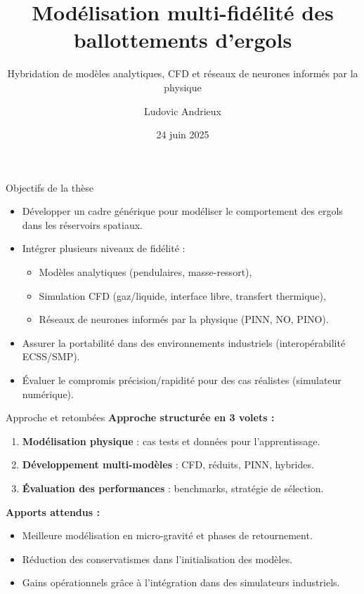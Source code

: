 \documentclass{beamer}
\title[Proposition de thèse]{Modélisation multi-fidélité des ballottements d’ergols}
\subtitle{Hybridation de modèles analytiques, CFD et réseaux de neurones informés par la physique}
\author{Ludovic Andrieux}
\date{24 juin 2025}
\begin{document}
	
	\frame{\titlepage}
	
	\begin{frame}{Objectifs de la thèse}
		\begin{itemize}
			\item Développer un cadre générique pour modéliser le comportement des ergols dans les réservoirs spatiaux.
			\item Intégrer plusieurs niveaux de fidélité :
			\begin{itemize}
				\item Modèles analytiques (pendulaires, masse-ressort),
				\item Simulation CFD (gaz/liquide, interface libre, transfert thermique),
				\item Réseaux de neurones informés par la physique (PINN, NO, PINO).
			\end{itemize}
			\item Assurer la portabilité dans des environnements industriels (interopérabilité ECSS/SMP).
			\item Évaluer le compromis précision/rapidité pour des cas réalistes (simulateur numérique).
		\end{itemize}
	\end{frame}
	
	\begin{frame}{Approche et retombées}
		\textbf{Approche structurée en 3 volets :}
		\begin{enumerate}
			\item \textbf{Modélisation physique} : cas tests et données pour l’apprentissage.
			\item \textbf{Développement multi-modèles} : CFD, réduits, PINN, hybrides.
			\item \textbf{Évaluation des performances} : benchmarks, stratégie de sélection.
		\end{enumerate}
		\vspace{0.5cm}
		\textbf{Apports attendus :}
		\begin{itemize}
			\item Meilleure modélisation en micro-gravité et phases de retournement.
			\item Réduction des conservatismes dans l’initialisation des modèles.
			\item Gains opérationnels grâce à l’intégration dans des simulateurs industriels.
		\end{itemize}
	\end{frame}
	
\end{document}
